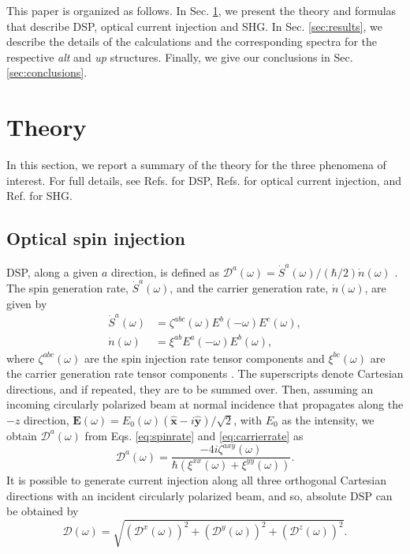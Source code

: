 \documentclass[pss]{wiley2sp} %
\begin{document}
This paper is organized as follows. In Sec. \ref{sec:theory}, we present the
theory and formulas that describe DSP, optical current injection and SHG.
In Sec. \ref{sec:results}, we describe the details of the calculations and the
corresponding spectra for the respective \emph{alt} and \emph{up} structures.
Finally, we give our conclusions in Sec. \ref{sec:conclusions}.


\section{Theory}\label{sec:theory}

In this section, we report a summary of the theory for the three phenomena of
interest. For full details, see Refs. \cite{nastosPRB07,mendozaPRB12} for DSP,
Refs. \cite{cabellosPRB11,sipePRB00} for optical current injection, and Ref.
\cite{andersonPRB15} for SHG. 


\subsection{Optical spin injection}\label{sec:theory-DSP}

DSP, along a given $a$ direction, is
defined as
$\mathcal{D}^{a}(\omega)=\dot{S}^{a}(\omega)/(\hbar/2)\dot{n}(\omega)$
\cite{mendozaPRB12}. The spin generation rate, $\dot{S}^{a}(\omega)$, and the
carrier generation rate, $\dot{n}(\omega)$, are given by
\begin{align}
\dot{S}^{a}(\omega)&= 
\zeta^{abc}(\omega)E^{b}(-\omega)E^{c}(\omega), \label{eq:spinrate} \\
\dot{n}(\omega)&= 
\xi^{ab}E^{a}(-\omega)E^{b}(\omega), \label{eq:carrierrate}
\end{align}
where $\zeta^{abc}(\omega)$ are the spin injection rate tensor components and
$\xi^{bc}(\omega)$ are the carrier generation rate tensor components
\cite{arzatePRB14}. The superscripts denote Cartesian directions, and if repeated,
they are to be summed over. Then, assuming an incoming circularly polarized beam at
normal incidence that propagates along the $-z$ direction, $\mathbf{E}(\omega) =
E_{0}(\omega)(\mathbf{\hat{x}} - i\mathbf{\hat{y}})/\sqrt{2}$, with $E_{0}$ as
the intensity, we obtain $\mathcal{D}^{a}(\omega)$ from Eqs.
\eqref{eq:spinrate} and \eqref{eq:carrierrate} \cite{arzatePRB14} as
\begin{equation}\label{eq:D^i}
\mathcal{D}^{a}(\omega) =  
\frac{-4i\zeta^{axy}(\omega)}
    {\hbar\left(\xi^{xx}(\omega) + \xi^{yy}(\omega)\right)}.
\end{equation}
It is possible to generate current injection along all three orthogonal
Cartesian directions with an incident circularly polarized beam, and so,
absolute DSP can be obtained \cite{arzatePRB14} by 
\begin{equation}\label{eq:dsptotal}
\mathcal{D}(\omega) =
\sqrt{(\mathcal{D}^{x}(\omega))^{2} + 
      (\mathcal{D}^{y}(\omega))^{2} +
      (\mathcal{D}^{z}(\omega))^{2}
      }.
\end{equation}
\end{document}
